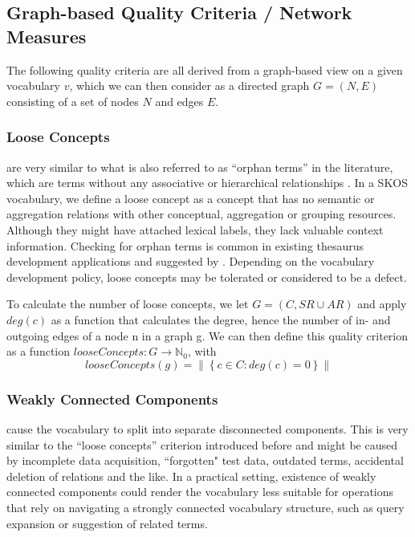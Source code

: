 \subsection{Graph-based Quality Criteria / Network Measures}
The following quality criteria are all derived from a graph-based view on a given vocabulary \(v\), which we can then consider as a directed graph \(G=(N,E)\) consisting of a set of nodes \(N\) and edges \(E\).

\subsubsection{Loose Concepts} are very similar to what is also referred to as ``orphan terms'' in the literature, which are terms without any associative or hierarchical relationships \cite{Z39.19:2005,Hedden2010}. In a SKOS vocabulary, we define a loose concept as a concept that has no semantic or aggregation relations with other conceptual, aggregation or grouping resources. Although they might have attached lexical labels, they lack valuable context information. Checking for orphan terms is common in existing thesaurus development applications and suggested by \cite{Z39.19:2005}. Depending on the vocabulary development policy, loose concepts may be tolerated or considered to be a defect.

\begin{definition}
    
To calculate the number of loose concepts, we let \(G = (C, SR \cup AR)\)  and apply \(deg(c)\) as a function that calculates the degree, hence the number of in- and outgoing edges of a node n in a graph g. We can then define this quality criterion as a function \(looseConcepts : G \rightarrow \mathbb{N}_{0}\), with \[looseConcepts(g) = \left\|\left\{c \in C : deg(c) = 0\right\}\right\|\]
\end{definition}

\subsubsection{Weakly Connected Components} cause the vocabulary to split into separate disconnected components. This is very similar to the ``loose concepts” criterion introduced before and might be caused by incomplete data acquisition, ``forgotten" test data, outdated terms, accidental deletion of relations and the like. In a practical setting, existence of weakly connected components could render the vocabulary less suitable for operations that rely on navigating a strongly connected vocabulary structure, such as query expansion or suggestion of related terms.

